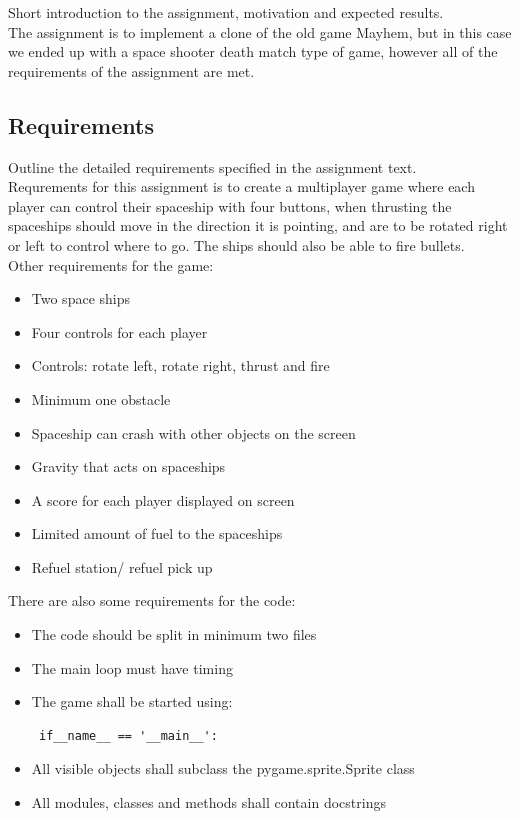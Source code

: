 Short introduction to the assignment, motivation and expected results.\\

The assignment is to implement a clone of the old game Mayhem, but in this case we ended up with a space shooter death match type of game, however all of the requirements of the assignment are met. 

\subsection{Requirements}

Outline the detailed requirements specified in the assignment text. \\

Requrements for this assignment is to create a multiplayer game where each player can control their spaceship with four buttons, when thrusting the spaceships should move in the direction it is pointing, and are to be rotated right or left to control where to go. The ships should also be able to fire bullets.\\

Other requirements for the game:

\begin{itemize}

\item Two space ships
\item Four controls for each player
\item Controls: rotate left, rotate right, thrust and fire
\item Minimum one obstacle
\item Spaceship can crash with other objects on the screen
\item Gravity that acts on spaceships
\item A score for each player displayed on screen
\item Limited amount of fuel to the spaceships
\item Refuel station/ refuel pick up

\end{itemize}

There are also some requirements for the code:

\begin{itemize}

\item The code should be split in minimum two files
\item The main loop must have timing
\item The game shall be started using: 
\begin{verbatim} if__name__ == '__main__':\end{verbatim}
\item All visible objects shall subclass the pygame.sprite.Sprite class
\item All modules, classes and methods shall contain docstrings

\end{itemize}


